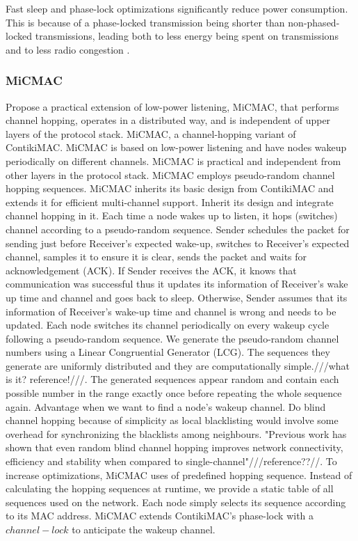 Fast sleep and phase-lock optimizations significantly reduce power consumption. This is because of a phase-locked transmission being shorter than non-phased-locked transmissions, leading both to less energy being spent on transmissions and to less radio congestion \cite{contikimac}.

\subsubsection{MiCMAC}
Propose a practical extension of low-power listening, MiCMAC, that performs channel hopping, operates in a distributed way, and is independent of upper layers of the protocol stack. MiCMAC, a channel-hopping variant of ContikiMAC. MiCMAC is based on low-power listening and have nodes wakeup periodically on different channels. MiCMAC is practical and independent from other layers in the protocol stack. MiCMAC employs pseudo-random channel hopping sequences. MiCMAC inherits its basic design from ContikiMAC and extends it for efficient multi-channel support. Inherit its design and integrate channel hopping in it. Each time a node wakes up to listen, it hops (switches) channel according to a pseudo-random sequence. Sender schedules the packet for sending just before Receiver's expected wake-up, switches to Receiver's expected channel, samples it to ensure it is clear, sends the packet and waits for acknowledgement (ACK). If Sender receives the ACK, it knows that communication was successful thus it updates its information of Receiver's wake up time and channel and goes back to sleep. Otherwise, Sender assumes that its information of Receiver's wake-up time and channel is wrong and needs to be updated. Each node switches its channel periodically on every wakeup cycle following a pseudo-random sequence. We generate the pseudo-random channel numbers using a Linear Congruential Generator (LCG). The sequences they generate are uniformly distributed and they are computationally simple.///what is it? reference!///. The generated sequences appear random and contain each possible number in the range exactly once before repeating the whole sequence again. Advantage when we want to find a node's wakeup channel. Do blind channel hopping because of simplicity as local blacklisting would involve some overhead for synchronizing the blacklists among neighbours. "Previous work has shown that even random blind channel hopping improves network connectivity, efficiency and stability when compared to single-channel"///reference??//. To increase optimizations, MiCMAC uses of predefined hopping sequence. Instead of calculating the hopping sequences at runtime, we provide a static table of all sequences used on the network. Each node simply selects its sequence according to its MAC address. MiCMAC extends ContikiMAC's phase-lock with a $channel-lock$ to anticipate the wakeup channel.

